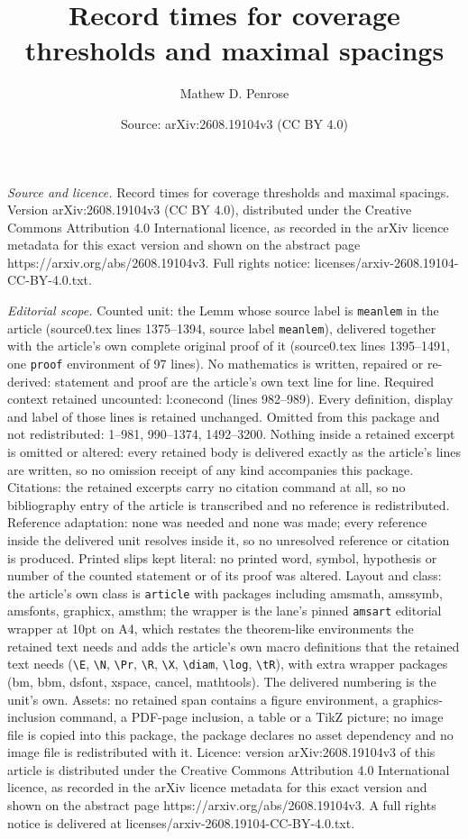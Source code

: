 \documentclass[10pt,a4paper]{amsart}
\title[Record times for coverage thresholds and maximal spacings]{Record times for coverage thresholds and maximal spacings}
\author{Mathew D. Penrose}
\date{Source: arXiv:2608.19104v3 (CC BY 4.0)}
\begin{document}
\maketitle

\noindent\emph{Source and licence.} Record times for coverage thresholds and maximal spacings. Version arXiv:2608.19104v3 (CC BY 4.0), distributed under the Creative Commons Attribution 4.0 International licence, as recorded in the arXiv licence metadata for this exact version and shown on the abstract page https://arxiv.org/abs/2608.19104v3. Full rights notice: licenses/arxiv-2608.19104-CC-BY-4.0.txt.\par\smallskip

\noindent\textit{Editorial scope.} Counted unit: the Lemm whose source label is \texttt{meanlem} in the article (source0.tex lines 1375--1394, source label \texttt{meanlem}), delivered together with the article's own complete original proof of it (source0.tex lines 1395--1491, one \texttt{proof} environment of 97 lines). No mathematics is written, repaired or re-derived: statement and proof are the article's own text line for line. Required context retained uncounted: l:conecond (lines 982--989). Every definition, display and label of those lines is retained unchanged. Omitted from this package and not redistributed: 1--981, 990--1374, 1492--3200. Nothing inside a retained excerpt is omitted or altered: every retained body is delivered exactly as the article's lines are written, so no omission receipt of any kind accompanies this package. Citations: the retained excerpts carry no citation command at all, so no bibliography entry of the article is transcribed and no reference is redistributed. Reference adaptation: none was needed and none was made; every reference inside the delivered unit resolves inside it, so no unresolved reference or citation is produced. Printed slips kept literal: no printed word, symbol, hypothesis or number of the counted statement or of its proof was altered. Layout and class: the article's own class is \texttt{article} with packages including amsmath, amssymb, amsfonts, graphicx, amsthm; the wrapper is the lane's pinned \texttt{amsart} editorial wrapper at 10pt on A4, which restates the theorem-like environments the retained text needs and adds the article's own macro definitions that the retained text needs (\texttt{\textbackslash E}, \texttt{\textbackslash N}, \texttt{\textbackslash Pr}, \texttt{\textbackslash R}, \texttt{\textbackslash X}, \texttt{\textbackslash diam}, \texttt{\textbackslash log}, \texttt{\textbackslash tR}), with extra wrapper packages (bm, bbm, dsfont, xspace, cancel, mathtools). The delivered numbering is the unit's own. Assets: no retained span contains a figure environment, a graphics-inclusion command, a PDF-page inclusion, a table or a TikZ picture; no image file is copied into this package, the package declares no asset dependency and no image file is redistributed with it. Licence: version arXiv:2608.19104v3 of this article is distributed under the Creative Commons Attribution 4.0 International licence, as recorded in the arXiv licence metadata for this exact version and shown on the abstract page https://arxiv.org/abs/2608.19104v3. A full rights notice is delivered at licenses/arxiv-2608.19104-CC-BY-4.0.txt. 
\end{document}
